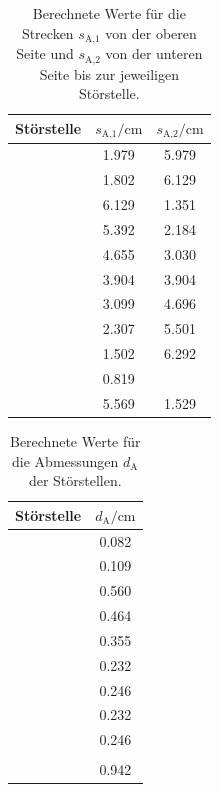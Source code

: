 \begin{table}[h]
  \centering
  \begin{tabular}{S S S}
    \toprule
    {Störstelle} & {$s_\text{A,1}/\si{\centi\meter}$} & {$s_\text{A,2}
    /\si{\centi\meter}$}\\
    \midrule
     & 1.979 & 5.979 \\
     & 1.802 & 6.129 \\
     & 6.129 & 1.351 \\
     & 5.392 & 2.184 \\
     & 4.655 & 3.030 \\
     & 3.904 & 3.904 \\
     & 3.099 & 4.696 \\
     & 2.307 & 5.501 \\
     & 1.502 & 6.292 \\
     & 0.819 & \text{ } \\
     & 5.569 & 1.529 \\
    \bottomrule
  \end{tabular}
  \caption{Berechnete Werte für die Strecken $s_\text{A,1}$ von der oberen Seite
  und $s_\text{A,2}$ von der unteren Seite bis zur jeweiligen Störstelle.}
  \label{tab:AScanStrecken}
\end{table}

\begin{table}[h]
  \centering
  \begin{tabular}{S S}
    \toprule
    {Störstelle} & {$d_\text{A}/\si{\centi\meter}$} \\
    \midrule
     & 0.082 \\
     & 0.109 \\
     & 0.560 \\
     & 0.464 \\
     & 0.355 \\
     & 0.232 \\
     & 0.246 \\
     & 0.232 \\
     & 0.246 \\
     & \text{ } \\
     & 0.942 \\
    \bottomrule
  \end{tabular}
  \caption{Berechnete Werte für die Abmessungen $d_\text{A}$ der Störstellen.}
  \label{tab:AScanDicken}
\end{table}

